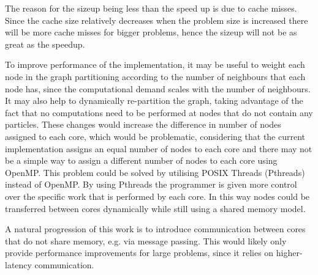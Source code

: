 The reason for the sizeup being less than the speed up is due to cache misses. Since the cache size relatively decreases when the problem size is increased there will be more cache misses for bigger problems, hence the sizeup will not be as great as the speedup. 

To improve performance of the implementation, it may be useful to weight each node in the graph partitioning according to the number of neighbours that each node has, since the computational demand scales with the number of neighbours. It may also help to dynamically re-partition the graph, taking advantage of the fact that no computations need to be performed at nodes that do not contain any particles. These changes would increase the difference in number of nodes assigned to each core, which would be problematic, considering that the current implementation assigns an equal number of nodes to each core and there may not be a simple way to assign a different number of nodes to each core using OpenMP. This problem could be solved by utilising POSIX Threads (Pthreads) instead of OpenMP. By using Pthreads the programmer is given more control over the specific work that is performed by each core. In this way nodes could be transferred between cores dynamically while still using a shared memory model.

A natural progression of this work is to introduce communication between cores that do not share memory, e.g. via message passing. This would likely only provide performance improvements for large problems, since it relies on higher-latency communication.